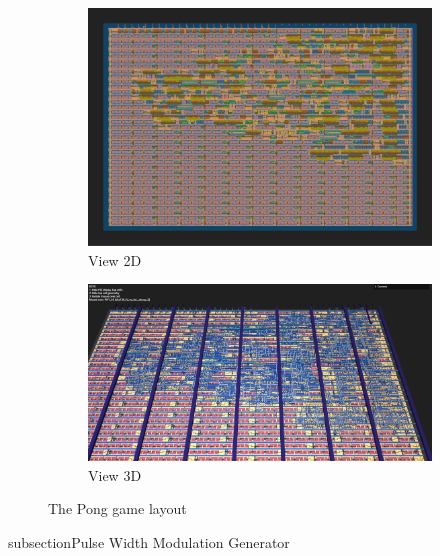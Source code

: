 \begin{figure}[H]
    \centering
    \begin{subfigure}[b]{0.45\textwidth}
        \includegraphics[width=\linewidth]{Pictures/Result_Pong_2D_View.png}
        \caption{View 2D}\label{fig:PWM_2D}
    \end{subfigure}
    \begin{subfigure}[b]{0.45\textwidth}
        \includegraphics[width=\linewidth]{Pictures/Result_Pong_3D_View.png}
        \caption{View 3D}\label{fig:PWM_3D}
    \end{subfigure}
    \caption{The Pong game layout}\label{fig:PWM}
\end{figure}

subsection{Pulse Width Modulation Generator}

